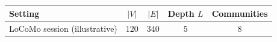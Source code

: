 \begin{tabular}{@{}lcccc@{}}
\toprule
\textbf{Setting} & $|V|$ & $|E|$ & Depth $L$ & Communities \\
\midrule
LoCoMo session (illustrative) & 120 & 340 & 5 & 8 \\
\bottomrule
\end{tabular}